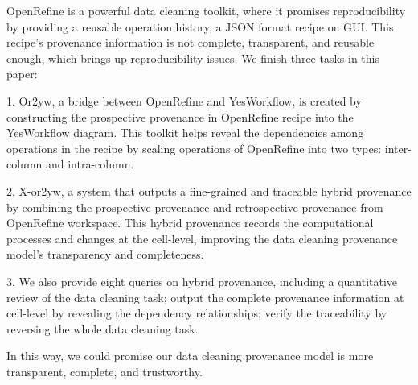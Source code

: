 
OpenRefine is a powerful data cleaning toolkit, where it promises reproducibility by providing a reusable operation history, a JSON format recipe on GUI. This recipe's provenance information is not complete, transparent, and reusable enough, which brings up reproducibility issues. We finish three tasks in this paper:

1. Or2yw, a bridge between OpenRefine and YesWorkflow, is created by constructing the prospective provenance in OpenRefine recipe into the YesWorkflow diagram. This toolkit helps reveal the dependencies among operations in the recipe by scaling operations of OpenRefine into two types: inter-column and intra-column.

2. X-or2yw, a system that outputs a fine-grained and traceable hybrid provenance by combining the prospective provenance and retrospective provenance from OpenRefine workspace. This hybrid provenance records the computational processes and changes at the cell-level, improving the data cleaning provenance model's transparency and completeness. 

3. We also provide eight queries on hybrid provenance, including a quantitative review of the data cleaning task; output the complete provenance information at cell-level by revealing the dependency relationships; verify the traceability by
reversing the whole data cleaning task.

In this way, we could promise our data cleaning provenance model is more transparent, complete, and trustworthy. 




% 
% 




